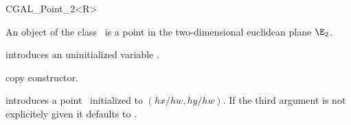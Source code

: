 \ccHtmlNoClassLinks
\ccHtmlNoClassIndex
\ccHtmlNoClassFile

\begin{ccClassTemplate} {CGAL_Point_2<R>}



\ccDefinition
An object of the class \ccClassName\ is a point in the two-dimensional
euclidean plane $\E_2$. 


\ccCreation
{}


\ccHidden {}
             {introduces an uninitialized variable \ccVar.}

\ccHidden {}
            {copy constructor.}

            {introduces a point \ccVar\ initialized to $(hx/hw,hy/hw)$.
             If the third argument is not explicitely given it defaults
             to .}

\end{ccClassTemplate} 

%
%
%
%
